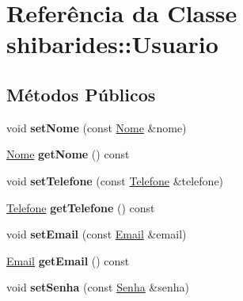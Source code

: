 \hypertarget{classshibarides_1_1Usuario}{}\section{Referência da Classe shibarides\+:\+:Usuario}
\label{classshibarides_1_1Usuario}
\subsection*{Métodos Públicos}
\begin{DoxyCompactItemize}
\item 
void {\bfseries set\+Nome} (const \hyperlink{classshibarides_1_1Nome}{Nome} \&nome)\hypertarget{classshibarides_1_1Usuario_a605b73d80deba51209b16c15e7b93bd2}{}\label{classshibarides_1_1Usuario_a605b73d80deba51209b16c15e7b93bd2}

\item 
\hyperlink{classshibarides_1_1Nome}{Nome} {\bfseries get\+Nome} () const \hypertarget{classshibarides_1_1Usuario_ab85327f5d8942aca054561c6716e9d18}{}\label{classshibarides_1_1Usuario_ab85327f5d8942aca054561c6716e9d18}

\item 
void {\bfseries set\+Telefone} (const \hyperlink{classshibarides_1_1Telefone}{Telefone} \&telefone)\hypertarget{classshibarides_1_1Usuario_a2be45f53adbb82577dbe5821d767baed}{}\label{classshibarides_1_1Usuario_a2be45f53adbb82577dbe5821d767baed}

\item 
\hyperlink{classshibarides_1_1Telefone}{Telefone} {\bfseries get\+Telefone} () const \hypertarget{classshibarides_1_1Usuario_ad8658cd8fbe83ec38321849a88a48489}{}\label{classshibarides_1_1Usuario_ad8658cd8fbe83ec38321849a88a48489}

\item 
void {\bfseries set\+Email} (const \hyperlink{classshibarides_1_1Email}{Email} \&email)\hypertarget{classshibarides_1_1Usuario_a754f27880c0ce24072844655487554e5}{}\label{classshibarides_1_1Usuario_a754f27880c0ce24072844655487554e5}

\item 
\hyperlink{classshibarides_1_1Email}{Email} {\bfseries get\+Email} () const \hypertarget{classshibarides_1_1Usuario_ac78cb31456c8962980dcb5089bf60bee}{}\label{classshibarides_1_1Usuario_ac78cb31456c8962980dcb5089bf60bee}

\item 
void {\bfseries set\+Senha} (const \hyperlink{classshibarides_1_1Senha}{Senha} \&senha)\hypertarget{classshibarides_1_1Usuario_a089f1080a88d5170d210c69c77127b06}{}\label{classshibarides_1_1Usuario_a089f1080a88d5170d210c69c77127b06}


\end{DoxyCompactItemize}
